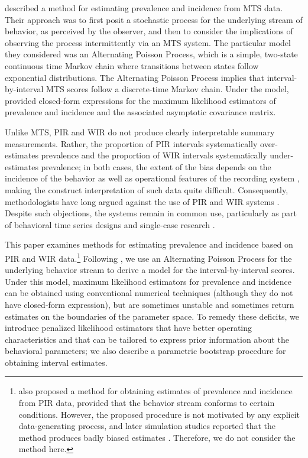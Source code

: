 \documentclass[man, noextraspace, floatsintext]{apa6}\usepackage[]{graphicx}\usepackage[]{color}
\begin{document}
\citet{Brown1977estimation} described a method for estimating prevalence and incidence from MTS data. Their approach was to first posit a stochastic process for the underlying stream of behavior, as perceived by the observer, and then to consider the implications of observing the process intermittently via an MTS system. The particular model they considered was an Alternating Poisson Process, which is a simple, two-state continuous time Markov chain where transitions between states follow exponential distributions. The Alternating Poisson Process implies that interval-by-interval MTS scores follow a discrete-time Markov chain. Under the model, \citet[see also \citealp{Griffin1983parametric}]{Brown1977estimation} provided closed-form expressions for the maximum likelihood estimators of prevalence and incidence and the associated asymptotic covariance matrix.

Unlike MTS, PIR and WIR do not produce clearly interpretable summary measurements. Rather, the proportion of PIR intervals systematically over-estimates prevalence and the proportion of WIR intervals systematically under-estimates prevalence; in both cases, the extent of the bias depends on the incidence of the behavior as well as operational features of the recording system \citep{Kraemer1979one, Rogosa1991statistical}, making the construct interpretation of such data quite difficult. Consequently, methodologists have long argued against the use of PIR and WIR systems \citep[cf.]{Altmann1974observational, Mann1991time, Lane2014using}. Despite such objections, the systems remain in common use, particularly as part of behavioral time series designs and single-case research \citep{Rapp2007interval, Mudford2009continuous, Lane2014using}. 

This paper examines methods for estimating prevalence and incidence based on PIR and WIR data.\footnote{\citet{Suen1986post, Suen1989analyzing} also proposed a method for obtaining estimates of prevalence and incidence from PIR data, provided that the behavior stream conforms to certain conditions. However, the proposed procedure is not motivated by any explicit data-generating process, and later simulation studies reported that the method produces badly biased estimates \citep[sec. 5.2]{Rogosa1991statistical}. Therefore, we do not consider the method here.} Following \citet{Brown1977estimation}, we use an Alternating Poisson Process for the underlying behavior stream to derive a model for the interval-by-interval scores. Under this model, maximum likelihood estimators for prevalence and incidence can be obtained using conventional numerical techniques (although they do not have closed-form expression), but are sometimes unstable and sometimes return estimates on the boundaries of the parameter space. To remedy these deficits, we introduce penalized likelihood estimators that have better operating characteristics and that can be tailored to express prior information about the behavioral parameters; we also describe a parametric bootstrap procedure for obtaining interval estimates.
\end{document}
